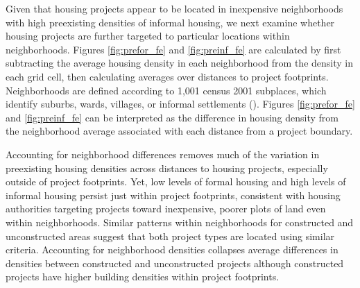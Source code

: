 \documentclass[12pt]{article}
\begin{document}
Given that housing projects appear to be located in inexpensive neighborhoods with high preexisting densities of informal housing, we next examine whether housing projects are further targeted to particular locations within neighborhoods.  Figures \ref{fig:prefor_fe} and \ref{fig:preinf_fe} are calculated by first subtracting the average housing density in each neighborhood from the density in each grid cell, then calculating averages over distances to project footprints.  Neighborhoods are defined according to 1,001 census 2001 subplaces, which identify suburbs, wards, villages, or informal settlements (\cite{censusmeta}).  Figures \ref{fig:prefor_fe} and \ref{fig:preinf_fe} can be interpreted as the difference in housing density from the neighborhood average associated with each distance from a project boundary.  

Accounting for neighborhood differences removes much of the variation in preexisting housing densities across distances to housing projects, especially outside of project footprints.  Yet, low levels of formal housing and high levels of informal housing persist just within project footprints, consistent with housing authorities targeting projects toward inexpensive, poorer plots of land even within neighborhoods.  Similar patterns within neighborhoods for constructed and unconstructed areas suggest that both project types are located using similar criteria.  Accounting for neighborhood densities collapses average differences in densities between constructed and unconstructed projects although constructed projects have higher building densities within project footprints.  

\end{document}
